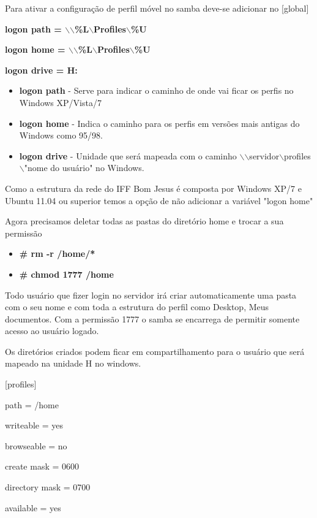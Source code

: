 Para ativar a configuração de perfil móvel no samba deve-se adicionar no [global] 

\textbf	{logon path = $\backslash$$\backslash$\%L$\backslash$Profiles$\backslash$\%U}

\textbf {logon home = $\backslash$$\backslash$\%L$\backslash$Profiles$\backslash$\%U}

\textbf	{logon drive = H:}

\begin{itemize}
	\item \textbf{logon path} - Serve para indicar o caminho de onde vai ficar os perfis no Windows XP/Vista/7 
	\item \textbf{logon home} - Indica o caminho para os perfis em versões mais antigas do Windows como 95/98.
	\item \textbf{logon drive} - Unidade que será mapeada com o caminho $\backslash$$\backslash$servidor$\backslash$profiles$\backslash$"nome do usuário" no Windows.
\end{itemize}

Como a estrutura da rede do IFF Bom Jesus é composta por Windows XP/7 e Ubuntu 11.04 ou superior temos a opção de não adicionar a variável "logon home" 

Agora precisamos deletar todas as pastas do diretório home e trocar a sua permissão 

\begin{itemize}
	\item \textbf{\# rm -r /home/*}
	\item \textbf{\# chmod 1777 /home}
\end{itemize}

Todo usuário que fizer login no servidor irá criar automaticamente uma pasta com o seu nome e com toda a estrutura do perfil como Desktop, Meus documentos. Com a permissão 1777 o samba se encarrega de permitir somente acesso ao usuário logado.

Os diretórios criados podem ficar em compartilhamento para o usuário que será mapeado na unidade H no windows.

[profiles] 

	path = /home 
	
	writeable = yes 
	
	browseable = no 
	
	create mask = 0600 
	
	directory mask = 0700 
	
	available = yes 

